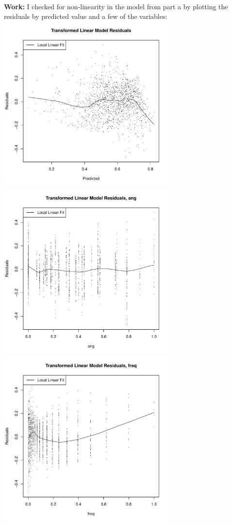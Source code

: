 \documentclass[11pt]{article}
\theoremstyle{definition}
\begin{document}
\begin{itemize}
\begin{itemize}
                {\bf Work:} I checked for non-linearity in the model from part a by plotting the residuals by predicted value and a few of the variables: \\
                \includegraphics[width=9cm]{final/1b_res_plot_lm2} 
                \includegraphics[width=9cm]{final/1b_res_plot_tran_ang} \\ 
                \includegraphics[width=9cm]{final/1b_res_plot_tran_freq}  

\end{itemize}
\end{itemize}
\end{document}
